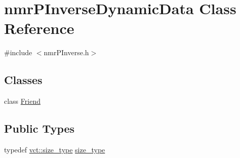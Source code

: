 \hypertarget{classnmr_p_inverse_dynamic_data}{}\section{nmr\+P\+Inverse\+Dynamic\+Data Class Reference}
\label{classnmr_p_inverse_dynamic_data}


{\ttfamily \#include $<$nmr\+P\+Inverse.\+h$>$}

\subsection*{Classes}
\begin{DoxyCompactItemize}
\item 
class \hyperlink{classnmr_p_inverse_dynamic_data_1_1_friend}{Friend}
\end{DoxyCompactItemize}
\subsection*{Public Types}
\begin{DoxyCompactItemize}
\item 
typedef \hyperlink{namespacevct_a3e2935e13aac4500965e00d30565775b}{vct\+::size\+\_\+type} \hyperlink{classnmr_p_inverse_dynamic_data_a059041cc0fb800515bffe5bb351b01cb}{size\+\_\+type}
\end{DoxyCompactItemize}
